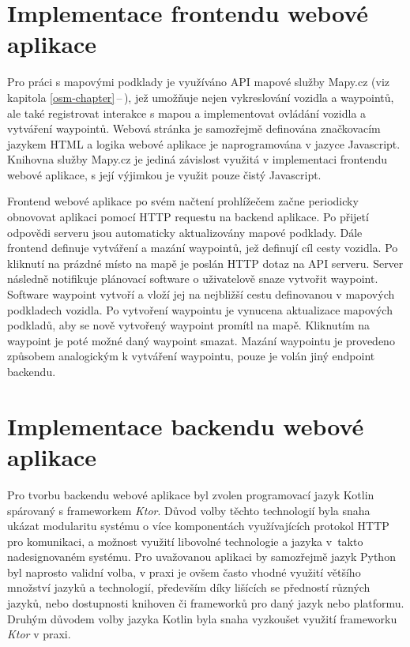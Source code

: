 \documentclass[czech, bachelor]{diploma}
\newcommand{\filipref}[1]{\ref{#1}\,--\,\nameref{#1}}
\begin{document}
\section{Implementace frontendu webové aplikace}

Pro práci s mapovými podklady je využíváno API mapové služby Mapy.cz (viz kapitola \filipref{osm-chapter}), jež umožňuje nejen
vykreslování vozidla a waypointů, ale také registrovat interakce s mapou a implementovat ovládání vozidla a vytváření waypointů.
Webová stránka je samozřejmě definována značkovacím jazykem HTML a logika webové aplikace je naprogramována v jazyce Javascript.
Knihovna služby Mapy.cz je jediná závislost využitá v implementaci frontendu webové aplikace, s její výjimkou je využit pouze
čistý Javascript.

Frontend webové aplikace po svém načtení prohlížečem začne periodicky obnovovat aplikaci pomocí HTTP requestu na backend aplikace.
Po přijetí odpovědi serveru jsou automaticky aktualizovány mapové podklady. Dále frontend definuje vytváření a mazání waypointů,
jež definují cíl cesty vozidla. Po kliknutí na prázdné místo na mapě je poslán HTTP dotaz na API serveru. Server následně
notifikuje plánovací software o uživatelově snaze vytvořit waypoint. Software waypoint vytvoří a vloží jej na nejbližší cestu
definovanou v mapových podkladech vozidla. Po vytvoření waypointu je vynucena aktualizace mapových podkladů, aby se nově vytvořený
waypoint promítl na mapě. Kliknutím na waypoint je poté možné daný waypoint smazat. Mazání waypointu je provedeno způsobem
analogickým k vytváření waypointu, pouze je volán jiný endpoint backendu.

\section{Implementace backendu webové aplikace}

Pro tvorbu backendu webové aplikace byl zvolen programovací jazyk Kotlin spárovaný s frameworkem \emph{Ktor}. Důvod volby těchto
technologií byla snaha ukázat modularitu systému o více komponentách využívajících protokol HTTP pro komunikaci, a možnost využití
libovolné technologie a jazyka v~takto nadesignovaném systému. Pro uvažovanou aplikaci by samozřejmě jazyk Python byl naprosto
validní volba, v praxi je ovšem často vhodné využití většího množství jazyků a technologií, především díky lišících se předností
různých jazyků, nebo dostupnosti knihoven či frameworků pro daný jazyk nebo platformu. Druhým důvodem volby jazyka Kotlin byla
snaha vyzkoušet využití frameworku \emph{Ktor} v praxi.
\end{document}
